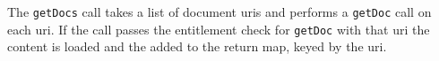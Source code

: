 The \verb+getDocs+ call takes a list of document uris and performs a \verb+getDoc+ call
on each uri. If the call passes the entitlement check for \verb+getDoc+ with that
uri the content is loaded and the added to the return map, keyed by the uri.
